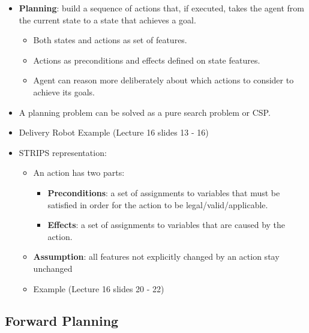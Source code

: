 \documentclass{article}
\begin{document}
\begin{itemize}
    \item \textbf{Planning}: build a sequence of actions that, if executed, takes the agent from the current state to a state that achieves a goal.
        \begin{itemize}
            \item Both states and actions as set of features.
            \item Actions as preconditions and effects defined on state features.
            \item Agent can reason more deliberately about which actions to consider to achieve its goals.
        \end{itemize}
    \item A planning problem can be solved as a pure search problem or CSP.
    \item Delivery Robot Example (Lecture 16 slides 13 - 16)
    \item STRIPS representation:
        \begin{itemize}
            \item An action has two parts:
                \begin{itemize}
                    \item \textbf{Preconditions}: a set of assignments to variables that must be satisfied in order for the action to be legal/valid/applicable.
                    \item \textbf{Effects}: a set of assignments to variables that are caused by the action.
                \end{itemize}
        \item \textbf{Assumption}: all features not explicitly changed by an action stay unchanged
        \item Example (Lecture 16 slides 20 - 22)
        \end{itemize}
\end{itemize}

\subsection{Forward Planning}
\end{document}
